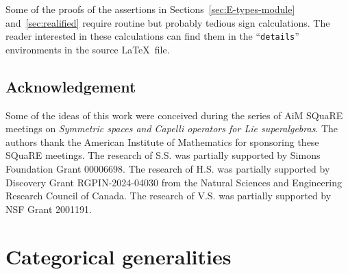 \documentclass[12pt]{amsart}
\begin{document}
Some of the proofs of the assertions in Sections~\ref{sec:E-types-module} and~\ref{sec:realified} require routine but probably  tedious sign calculations. The reader interested in these calculations can find them in the ``\texttt{details}'' environments in the source \LaTeX\ file.  


\subsection*{Acknowledgement} Some of the ideas of this work were conceived during the series of AiM SQuaRE meetings on \emph{Symmetric spaces and Capelli operators for Lie superalgebras}. The authors thank the 
American Institute of Mathematics for sponsoring these SQuaRE meetings.  
The research of S.S. was partially supported by Simons Foundation Grant 00006698. 
The research of H.S. was partially supported by  Discovery Grant 
RGPIN-2024-04030 from the Natural Sciences and Engineering Research Council of
Canada.
The research of V.S. was partially supported by NSF Grant 2001191.

  




\section{Categorical generalities}
\end{document}
